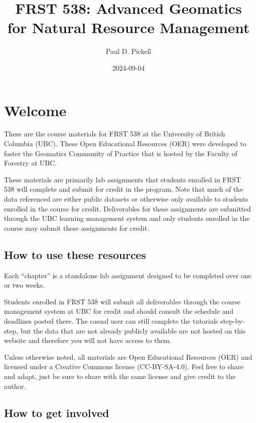 \documentclass[
]{book}
\title{FRST 538: Advanced Geomatics for Natural Resource Management}
\author{Paul D. Pickell}
\date{2024-09-04}
\begin{document}
\maketitle

{
\setcounter{tocdepth}{1}
\tableofcontents
}
\hypertarget{welcome}{%
\chapter*{Welcome}\label{welcome}}

These are the course materials for FRST 538 at the University of British Columbia (UBC). These Open Educational Resources (OER) were developed to foster the Geomatics Community of Practice that is hosted by the Faculty of Forestry at UBC.

These materials are primarily lab assignments that students enrolled in FRST 538 will complete and submit for credit in the program. Note that much of the data referenced are either public datasets or otherwise only available to students enrolled in the course for credit. Deliverables for these assignments are submitted through the UBC learning management system and only students enrolled in the course may submit these assignments for credit.

\hypertarget{how-to-use-these-resources}{%
\section*{How to use these resources}\label{how-to-use-these-resources}}

Each ``chapter'' is a standalone lab assignment designed to be completed over one or two weeks.

Students enrolled in FRST 538 will submit all deliverables through the course management system at UBC for credit and should consult the schedule and deadlines posted there. The casual user can still complete the tutorials step-by-step, but the data that are not already publicly available are not hosted on this website and therefore you will not have access to them.

Unless otherwise noted, all materials are Open Educational Resources (OER) and licensed under a Creative Commons license (CC-BY-SA-4.0). Feel free to share and adapt, just be sure to share with the same license and give credit to the author.

\hypertarget{how-to-get-involved}{%
\section*{How to get involved}\label{how-to-get-involved}}
\end{document}
